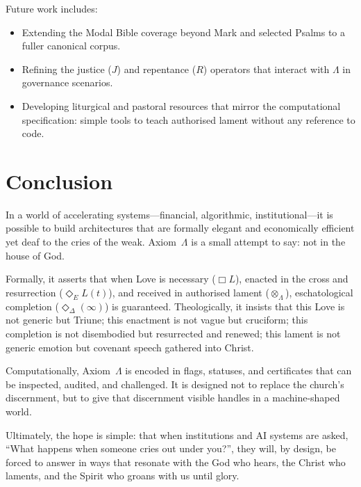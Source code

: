\documentclass[11pt]{article}
\begin{document}
Future work includes:

\begin{itemize}
  \item Extending the Modal Bible coverage beyond Mark and selected Psalms to a fuller canonical corpus.
  \item Refining the justice ($J$) and repentance ($R$) operators that interact with $\Lambda$ in governance scenarios.
  \item Developing liturgical and pastoral resources that mirror the computational specification: simple tools to teach authorised lament without any reference to code.
\end{itemize}

\section{Conclusion}

In a world of accelerating systems---financial, algorithmic, institutional---it is possible to build architectures that are formally elegant and economically efficient yet deaf to the cries of the weak. Axiom~$\Lambda$ is a small attempt to say: not in the house of God.

Formally, it asserts that when Love is necessary ($\Box L$), enacted in the cross and resurrection ($\Diamond_E L(t)$), and received in authorised lament ($\otimes_{\Lambda}$), eschatological completion ($\Diamond_{\Delta}(\infty)$) is guaranteed. Theologically, it insists that this Love is not generic but Triune; this enactment is not vague but cruciform; this completion is not disembodied but resurrected and renewed; this lament is not generic emotion but covenant speech gathered into Christ.

Computationally, Axiom~$\Lambda$ is encoded in flags, statuses, and certificates that can be inspected, audited, and challenged. It is designed not to replace the church's discernment, but to give that discernment visible handles in a machine-shaped world.

Ultimately, the hope is simple: that when institutions and AI systems are asked, ``What happens when someone cries out under you?'', they will, by design, be forced to answer in ways that resonate with the God who hears, the Christ who laments, and the Spirit who groans with us until glory.
\end{document}
